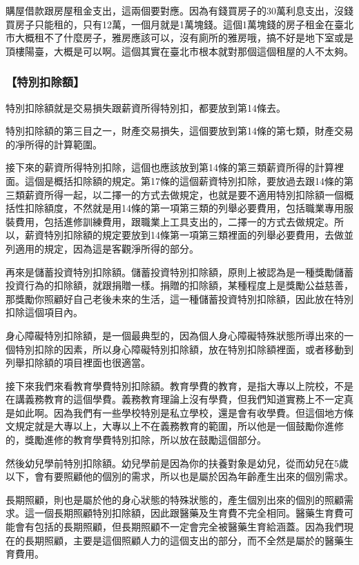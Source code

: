 \documentclass[oneside,sub3section]{ctexbook}
\begin{document}
購屋借款跟房屋租金支出，這兩個要對應。因為有錢買房子的30萬利息支出，沒錢買房子只能租的，只有12萬，一個月就是1萬塊錢。這個1萬塊錢的房子租金在臺北市大概租不了什麼房子，雅房應該可以，沒有廁所的雅房哦，搞不好是地下室或是頂樓陽臺，大概是可以啊。這個其實在臺北市根本就對那個這個租屋的人不太夠。

\hypertarget{ux7279ux5225ux6263ux9664ux984d}{%
\subsubsection{【特別扣除額】}\label{ux7279ux5225ux6263ux9664ux984d}}

特別扣除額就是交易損失跟薪資所得特別扣，都要放到第14條去。

特別扣除額的第三目之一，財產交易損失，這個要放到第14條的第七類，財產交易的凈所得的計算範圍。

接下來的薪資所得特別扣除，這個也應該放到第14條的第三類薪資所得的計算裡面。這個是概括扣除額的規定。第17條的這個薪資特別扣除，要放過去跟14條的第三類薪資所得一起，以二擇一的方式去做規定，也就是要不適用特別扣除額一個概括性扣除額度，不然就是用14條的第一項第三類的列舉必要費用，包括職業專用服裝費用，包括進修訓練費用，跟職業上工具支出的，二擇一的方式去做規定。所以，薪資特別扣除額的規定要放到14條第一項第三類裡面的列舉必要費用，去做並列適用的規定，因為這是客觀淨所得的部分。

再來是儲蓄投資特別扣除額。儲蓄投資特別扣除額，原則上被認為是一種獎勵儲蓄投資行為的扣除額，就跟捐贈一樣。捐贈的扣除額，某種程度上是獎勵公益慈善，那獎勵你照顧好自己老後未來的生活，這一種儲蓄投資特別扣除額，因此放在特別扣除這個項目內。

身心障礙特別扣除額，是一個最典型的，因為個人身心障礙特殊狀態所導出來的一個特別扣除的因素，所以身心障礙特別扣除額，放在特別扣除額裡面，或者移動到列舉扣除額的項目裡面也很適當。

接下來我們來看教育學費特別扣除額。教育學費的教育，是指大專以上院校，不是在講義務教育的這個學費。義務教育理論上沒有學費，但我們知道實務上不一定真是如此啊。因為我們有一些學校特別是私立學校，還是會有收學費。但這個地方條文規定就是大專以上，大專以上不在義務教育的範圍，所以他是一個鼓勵你進修的，獎勵進修的教育學費特別扣除，所以放在鼓勵這個部分。

然後幼兒學前特別扣除額。幼兒學前是因為你的扶養對象是幼兒，從而幼兒在5歲以下，會有要照顧他的個別的需求，所以也是屬於因為年齡產生出來的個別需求。

長期照顧，則也是屬於他的身心狀態的特殊狀態的，產生個別出來的個別的照顧需求。這一個長期照顧特別扣除額，因此跟醫藥及生育費不完全相同。醫藥生育費可能會有包括的長期照顧，但長期照顧不一定會完全被醫藥生育給涵蓋。因為我們現在的長期照顧，主要是這個照顧人力的這個支出的部分，而不全然是屬於的醫藥生育費用。
\end{document}
